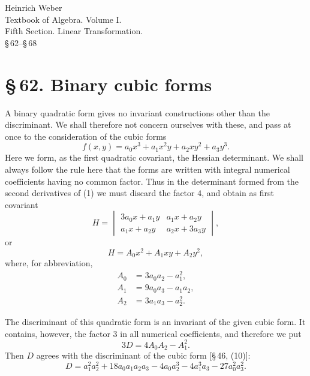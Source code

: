 \documentclass[11pt]{article}
\newcommand{\sect}[2]{\section*{\S\,#1. #2}}
\begin{document}
\begin{center}
{\large Heinrich Weber}\\[0.35em]
{\Large Textbook of Algebra. Volume I.}\\[0.35em]
{\large Fifth Section. Linear Transformation.}\\[0.25em]
{\large \S\,62--\S\,68}
\end{center}

\sect{62}{Binary cubic forms}

A binary quadratic form gives no invariant constructions other than the discriminant. We shall therefore not concern ourselves with these, and pass at once to the consideration of the cubic forms
\begin{equation}
 f(x,y)=a_0x^3+a_1x^2y+a_2xy^2+a_3y^3.
\tag{1}
\end{equation}
Here we form, as the first quadratic covariant, the Hessian determinant. We shall always follow the rule here that the forms are written with integral numerical coefficients having no common factor. Thus in the determinant formed from the second derivatives of (1) we must discard the factor $4$, and obtain as first covariant
\[
 H=\begin{vmatrix}
 3a_0x+a_1y & a_1x+a_2y\\
 a_1x+a_2y & a_2x+3a_3y
 \end{vmatrix},
\]
or
\begin{equation}
 H=A_0x^2+A_1xy+A_2y^2,
\tag{2}
\end{equation}
where, for abbreviation,
\begin{equation}
\begin{aligned}
 A_0&=3a_0a_2-a_1^2,\\
 A_1&=9a_0a_3-a_1a_2,\\
 A_2&=3a_1a_3-a_2^2.
\end{aligned}
\tag{3}
\end{equation}

The discriminant of this quadratic form is an invariant of the given cubic form. It contains, however, the factor $3$ in all numerical coefficients, and therefore we put
\begin{equation}
 3D=4A_0A_2-A_1^2.
\tag{4}
\end{equation}
Then $D$ agrees with the discriminant of the cubic form [\S\,46, (10)]:
\begin{equation}
 D=a_1^2a_2^2+18a_0a_1a_2a_3-4a_0a_2^3-4a_1^3a_3-27a_0^2a_3^2.
\tag{5}
\end{equation}
\end{document}
